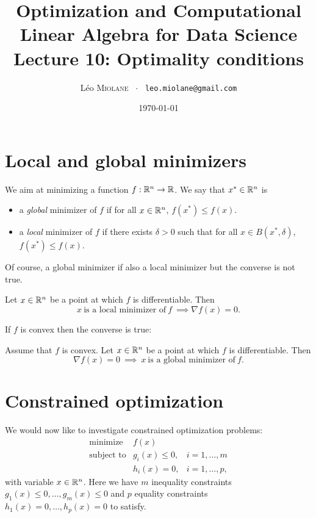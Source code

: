 \documentclass[11pt,nocut]{article}
\title{\vspace{-2.0cm}%
	Optimization and Computational Linear Algebra for Data Science\\
Lecture 10: Optimality conditions}
\author{Léo \textsc{Miolane} \ $\cdot$ \ \texttt{leo.miolane@gmail.com}}
\date{\today}
\begin{document}
\maketitle


\section{Local and global minimizers}

We aim at minimizing a function $f: \mathbb{R}^n \to \mathbb{R}$.
We say that $x^* \in \mathbb{R}^n$ is
\begin{itemize}
	\item a \emph{global} minimizer of $f$ if for all $x \in \mathbb{R}^n$, $f(x^*) \leq f(x)$.
	\item a \emph{local} minimizer of $f$ if there exists $\delta > 0$ such that for all $x \in B(x^*,\delta)$, $f(x^*) \leq f(x)$.
\end{itemize}
Of course, a global minimizer if also a local minimizer but the converse is not true.

\begin{proposition}\label{prop:zero_grad}
	Let $x \in \mathbb{R}^n$ be a point at which $f$ is differentiable. 
	Then
	$$
	x \ \text{is a local minimizer of} \ f \ \implies \nabla f(x) = 0.
	$$
\end{proposition}

If $f$ is convex then the converse is true:

\begin{proposition}\label{prop:zero_grad_convex}
	Assume that $f$ is convex.
	Let $x \in \mathbb{R}^n$ be a point at which $f$ is differentiable. 
	Then
	$$
	\nabla f(x) = 0 \ \implies \ x \ \text{is a global minimizer of} \ f.
	$$
\end{proposition}

\section{Constrained optimization}

We would now like to investigate constrained optimization problems:
\begin{equation}\label{eq:problem}
	\begin{array}{lll}
		\text{minimize} & f(x) & \\
		\text{subject to} & g_i(x) \leq 0, & i=1, \dots, m \\
						  & h_i(x) = 0, & i=1, \dots, p,
	\end{array}
\end{equation}
with variable $x \in \mathbb{R}^n$.
Here we have $m$ inequality constraints $g_1(x) \leq 0, \dots, g_m(x)\leq  0$ and $p$ equality constraints $h_1(x) = 0, \dots, h_p(x) = 0$ to satisfy.
\end{document}
